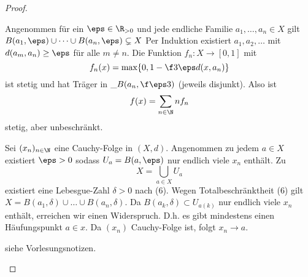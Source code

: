 \begin{st}
\begin{proof}
\begin{seg}[$(5) \implies (6)$]
			Angenommen für ein $\eps \in \R_{>0}$ und jede endliche Familie $a_1, \dotsc, a_n \in X$ gilt $B(a_1,\eps) \cup \dotsb \cup B(a_n,\eps) \subsetneq X$
			Per Induktion existiert $a_1, a_2, \dotsc$ mit $d(a_m,a_n) \ge \eps$ für alle $m \neq n$.
			Die Funktion $f_n : X \to [0,1]$ mit
			\[
				f_n(x) = \max \{ 0, 1 - \f 3\eps d(x,a_n) \}
			\]
			ist stetig und hat Träger in $\_B(a_n, \f \eps3)$ (jeweils disjunkt).
			Also ist
			\[
				f(x) = \sum_{n\in \N} n f_n
			\]
			stetig, aber unbeschränkt.
		\end{seg}
		\begin{seg}[$(6) \implies (7)$]
			Sei $(x_n)_{n \in \N}$ eine Cauchy-Folge in $(X,d)$.
			Angenommen zu jedem $a \in X$ existiert $\eps > 0$ sodass $U_a = B(a, \eps)$ nur endlich viele $x_n$ enthält.
			Zu
			\[
				X = \bigcup_{a \in X} U_a
			\]
			existiert eine Lebesgue-Zahl $\delta > 0$ nach (6).
			Wegen Totalbeschränktheit (6) gilt $X = B(a_1, \delta) \cup \dotsc \cup B(a_n,\delta)$.
			Da $B(a_k,\delta) \subset U_{a(k)}$ nur endlich viele $x_n$ enthält, erreichen wir einen Widerspruch.
			D.h. es gibt mindestens einen Häufungspunkt $a \in x$.
			Da $(x_n)$ Cauchy-Folge ist, folgt $x_n \to a$.
		\end{seg}
		\begin{seg}
			siehe Vorlesungsnotizen.
		\end{seg}
	\end{proof}
\end{st}

